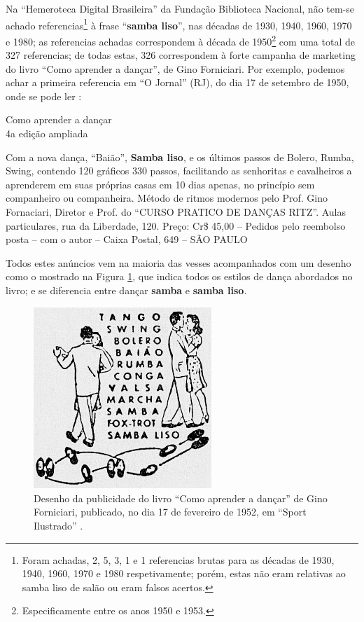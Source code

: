 Na ``Hemeroteca Digital Brasileira'' da Fundação Biblioteca Nacional,
não tem-se achado referencias\footnote{ Foram achadas,
2, 5, 3, 1 e 1 referencias brutas para as décadas de 1930, 1940, 1960, 1970 e 1980 respetivamente;
porém, estas não eram relativas ao samba liso de salão ou eram falsos acertos.} 
à frase ``\textbf{samba liso}'', nas décadas de 1930, 1940, 1960, 1970 e 1980;
as referencias achadas correspondem à década de 1950\footnote{Especificamente entre os anos 1950 e 1953.}  
com uma total de 327 referencias;
de todas estas, 326 correspondem à forte campanha 
de marketing do livro
``Como aprender a dançar'', 
de Gino Forniciari. 
Por exemplo, podemos achar a primeira referencia em ``O Jornal'' (RJ),
do dia 17 de setembro de 1950, onde se pode ler \cite[3ra seção pp. 9]{jornalanunciodanca1}:
\begin{citando}
\begin{center}
Como aprender a dançar\\
4a edição ampliada
\end{center}
Com a nova dança, ``Baião'', \textbf{Samba liso}, e os
últimos passos de Bolero, Rumba, Swing, contendo
120 gráficos 330 passos, facilitando as senhoritas 
e cavalheiros a aprenderem em suas próprias 
casas em 10 dias apenas, no princípio sem
companheiro ou companheira. Método de ritmos modernos
pelo Prof. Gino Fornaciari, 
Diretor e Prof. do ``CURSO PRATICO DE DANÇAS RITZ''.
Aulas particulares, rua da Liberdade, 120.
Preço: Cr\$ 45,00 -- Pedidos pelo reembolso posta 
-- com o autor -- Caixa Postal, 649 -- SÃO PAULO 
\end{citando}
Todos estes anúncios vem na maioria das vesses acompanhados com um desenho como
o mostrado na Figura \ref{fig:desenholivrodanca1}, que indica todos os estilos de dança abordados no livro;
e se diferencia entre dançar \textbf{samba} e \textbf{samba liso}.
\begin{figure}[h]
  \centering
    \includegraphics[width=0.6\textwidth]{chapters/cap-historia-dancasamba/comoaprenderdancar.jpg}
  \caption{Desenho da publicidade do livro ``Como aprender a dançar'' de Gino Forniciari,
publicado, no dia 17 de fevereiro de 1952, em ``Sport Ilustrado'' \cite[pp. 22]{sportlivropublidanca}.}
\label{fig:desenholivrodanca1}
\end{figure}

